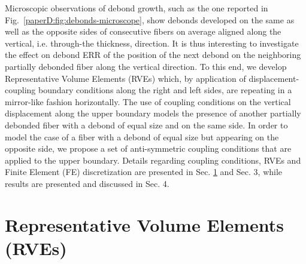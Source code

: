 Microscopic observations of debond growth, such as the one reported in Fig.~\ref{paperD:fig:debonds-microscope}, show debonds developed on the same as well as the opposite sides of consecutive fibers on average aligned along the vertical, i.e. through-the thickness, direction. It is thus interesting to investigate the effect on debond ERR of the position of the next debond on the neighboring partially debonded fiber along the vertical direction. To this end, we develop Representative Volume Elements (RVEs) which, by application of displacement-coupling boundary conditions along the right and left sides, are repeating in a mirror-like fashion horizontally. The use of coupling conditions on the vertical displacement along the upper boundary models the presence of another partially debonded fiber with a debond of equal size and on the same side. In order to model the case of a fiber with a debond of equal size but appearing on the opposite side, we propose a set of anti-symmetric coupling conditions that are applied to the upper boundary. Details regarding coupling conditions, RVEs and Finite Element (FE) discretization are presented in Sec. \ref{paperD:sec:RVEs} and Sec. 3, while results are presented and discussed in Sec. 4.


\section{Representative Volume Elements (RVEs)}\label{paperD:sec:RVEs}

